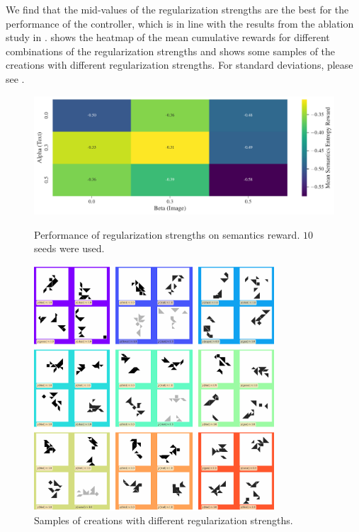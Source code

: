 We find that the mid-values of the regularization strengths are the best for the performance of the controller, which is in line with the results from the ablation study in .
 shows the heatmap of the mean cumulative rewards for different combinations of the regularization strengths and  shows some samples of the creations with different regularization strengths. For standard deviations, please see .

\begin{figure}[h]
    \centering
    \includegraphics[width=\textwidth]{images/alpha_beta-semantics_rair.pdf}
    \caption[Performance of regularization strengths on semantics reward.]{Performance of regularization strengths on semantics reward. \(10\) seeds were used.}
    \label{fig:alpha-beta-semantics}
    \vspace{12pt}
    \includegraphics[width=0.8\textwidth]{images/alpha_beta_rair_samples.pdf}
    \caption{Samples of creations with different regularization strengths.}
    \label{fig:alpha-beta-samples}
\end{figure}

